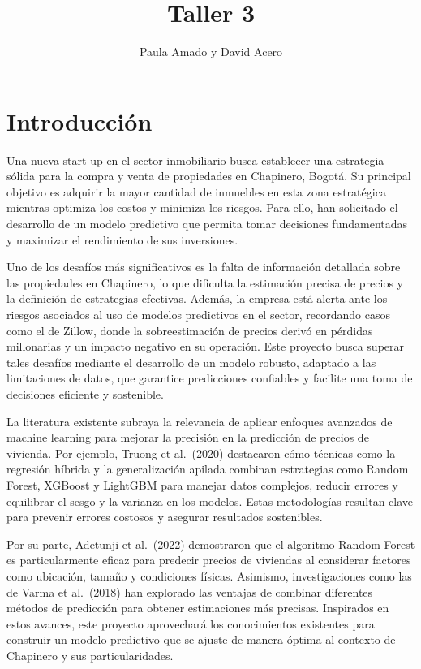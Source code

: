 \documentclass[
  12pt,
]{article}
\title{\textbf{Taller 3}}
\author{Paula Amado y David Acero}
\date{}
\begin{document}
\maketitle

\section{Introducción}

Una nueva start-up en el sector inmobiliario busca establecer una
estrategia sólida para la compra y venta de propiedades en Chapinero,
Bogotá. Su principal objetivo es adquirir la mayor cantidad de inmuebles
en esta zona estratégica mientras optimiza los costos y minimiza los
riesgos. Para ello, han solicitado el desarrollo de un modelo predictivo
que permita tomar decisiones fundamentadas y maximizar el rendimiento de
sus inversiones.

Uno de los desafíos más significativos es la falta de información
detallada sobre las propiedades en Chapinero, lo que dificulta la
estimación precisa de precios y la definición de estrategias efectivas.
Además, la empresa está alerta ante los riesgos asociados al uso de
modelos predictivos en el sector, recordando casos como el de Zillow,
donde la sobreestimación de precios derivó en pérdidas millonarias y un
impacto negativo en su operación. Este proyecto busca superar tales
desafíos mediante el desarrollo de un modelo robusto, adaptado a las
limitaciones de datos, que garantice predicciones confiables y facilite
una toma de decisiones eficiente y sostenible.

La literatura existente subraya la relevancia de aplicar enfoques
avanzados de machine learning para mejorar la precisión en la predicción
de precios de vivienda. Por ejemplo, Truong et al.~(2020) destacaron
cómo técnicas como la regresión híbrida y la generalización apilada
combinan estrategias como Random Forest, XGBoost y LightGBM para manejar
datos complejos, reducir errores y equilibrar el sesgo y la varianza en
los modelos. Estas metodologías resultan clave para prevenir errores
costosos y asegurar resultados sostenibles.

Por su parte, Adetunji et al.~(2022) demostraron que el algoritmo Random
Forest es particularmente eficaz para predecir precios de viviendas al
considerar factores como ubicación, tamaño y condiciones físicas.
Asimismo, investigaciones como las de Varma et al.~(2018) han explorado
las ventajas de combinar diferentes métodos de predicción para obtener
estimaciones más precisas. Inspirados en estos avances, este proyecto
aprovechará los conocimientos existentes para construir un modelo
predictivo que se ajuste de manera óptima al contexto de Chapinero y sus
particularidades.
\end{document}
